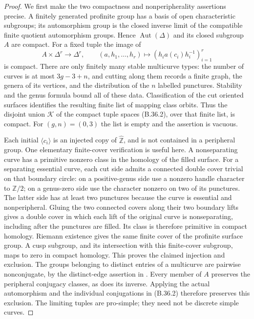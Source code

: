 \begin{proof}
We first make the two compactness and nonperipherality
assertions precise. A finitely generated profinite group has
a basis of open characteristic subgroups; its automorphism
group is the closed inverse limit of the compatible finite
quotient automorphism groups. Hence $\operatorname{Aut}(\Delta)$
and its closed subgroup $A$ are compact. For a fixed tuple the
image of
\[
 A\times\Delta^r\longrightarrow\Delta^r,\qquad
 (a,h_1,\ldots,h_r)\longmapsto
 (h_i a(c_i)h_i^{-1})_{i=1}^r
 \tag{B.36.2}
\]
is compact. There are only finitely many stable multicurve
types: the number of curves is at most $3g-3+n$, and cutting
along them records a finite graph, the genera of its vertices,
and the distribution of the $n$ labelled punctures. Stability
and the genus formula bound all of these data. Classification
of the cut oriented surfaces identifies the resulting finite
list of mapping class orbits. Thus the disjoint union
$\mathcal K$ of the compact tuple spaces (B.36.2), over that
finite list, is compact. For $(g,n)=(0,3)$ the list is empty
and the assertion is vacuous.

Each initial $\langle c_i\rangle$ is an injected copy of
$\widehat{\mathbb Z}$, and is not contained in a peripheral
group. One elementary finite-cover verification is useful
here. A nonseparating curve has a primitive nonzero class
in the homology of the filled surface. For a separating
essential curve, each cut side admits a connected double
cover trivial on that boundary circle: on a positive-genus
side use a nonzero handle character to $\mathbb Z/2$; on
a genus-zero side use the character nonzero on two of its
punctures. The latter side has at least two punctures because
the curve is essential and nonperipheral. Gluing the two
connected covers along their two boundary lifts gives a
double cover in which each lift of the original curve is
nonseparating, including after the punctures are filled.
Its class is therefore primitive in compact homology.
Riemann existence gives the same finite cover of the
profinite surface group. A cusp subgroup, and its intersection
with this finite-cover subgroup, maps to zero in compact
homology. This proves the claimed injection and exclusion.
The groups belonging to distinct entries of a multicurve
are pairwise nonconjugate, by the distinct-edge assertion
in \cite[Proposition 1.2]{F-MochizukiCombinatorial}.
Every member of $A$ preserves the peripheral conjugacy
classes, as does its inverse. Applying the actual
automorphism and the individual conjugations in (B.36.2)
therefore preserves this exclusion. The limiting tuples
are pro-simple; they need not be discrete simple curves.


\end{proof}
